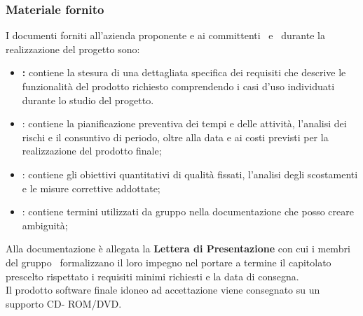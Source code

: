 \subsubsection{Materiale fornito} 
I documenti forniti all'azienda proponente e ai committenti \VT\ e \CR\ durante la realizzazione del progetto sono:
\begin{itemize}
	\item \textbf{\AdR:} contiene la stesura di una dettagliata specifica dei requisiti che descrive le funzionalità del prodotto richiesto comprendendo i casi d'uso individuati durante lo studio del progetto.
	\item \textbf{\PdP}: contiene la pianificazione preventiva dei tempi e delle attività, l’analisi dei rischi e il consuntivo di periodo, oltre alla data e ai costi previsti per la realizzazione del prodotto finale;
	\item \textbf{\PdQ}: contiene gli obiettivi quantitativi di qualità fissati, l'analisi degli scostamenti e le misure correttive addottate;
	\item \textbf{\Glossario}: contiene termini utilizzati da gruppo nella documentazione che posso creare ambiguità;
	\begin{comment}
	\item \textbf{\glo{Proof of Concept} e \glo{Technology Baseline}}: definiscono le tecnologie utilizzate dal gruppo;
	\item \textbf{\glo{Product Baseline}}: definisce a livello tecnico le scelte implementative del gruppo;
	\item \textbf{Manuali:} guide per l'utilizzo e l'installazione del progetto.
	\end{comment}
	
\end{itemize}
Alla documentazione è allegata la \textbf{Lettera di Presentazione} con cui i membri del gruppo \Gruppo\ formalizzano il loro impegno nel portare a termine il capitolato prescelto rispettato i requisiti minimi richiesti e la data di consegna. \\
Il prodotto software finale idoneo ad accettazione viene consegnato su un supporto CD- ROM/DVD.

